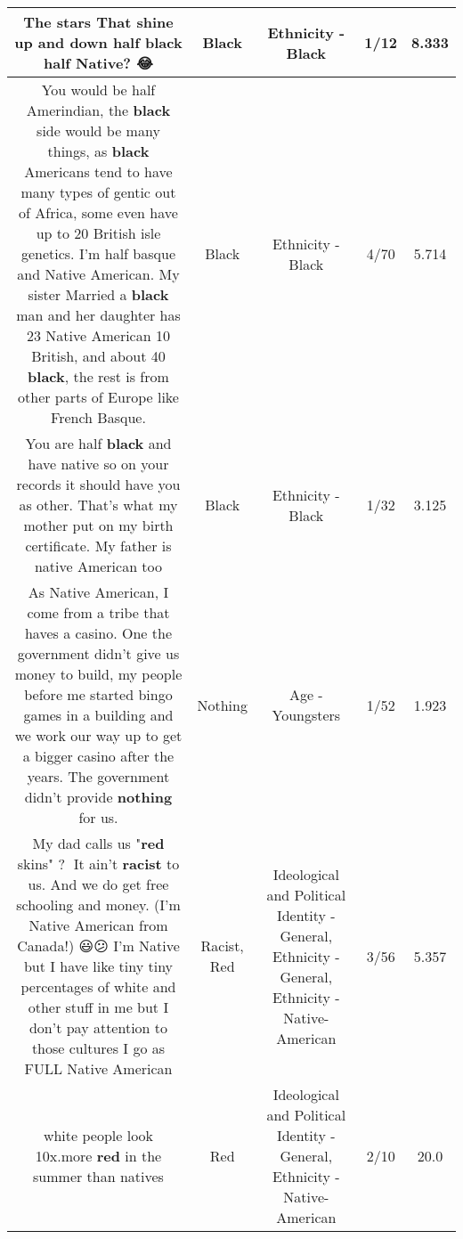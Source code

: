 \documentclass[11pt]{article}
\newlength\mylength
\begin{document}
\begin{center}
\begin{longtable}{|C{.65\mylength}|C{.30\mylength}|C{.12\mylength}|C{.12\mylength}|C{.12\mylength}|}
  \small The stars That shine up and down half \textbf{black} half Native? 😂\normalsize   & Black & Ethnicity - Black & 1/12 & 8.333 \\  \hline
  \small You would be half Amerindian, the \textbf{black} side would be many things, as \textbf{black} Americans tend to have many types of gentic out of Africa, some even have up to 20 British isle genetics. I'm half basque and Native American. My sister Married a \textbf{black} man and her daughter has 23 Native American 10 British, and about 40 \textbf{black}, the rest is from other parts of Europe like French Basque.\normalsize   & Black & Ethnicity - Black & 4/70 & 5.714 \\  \hline
  \small You are half \textbf{black} and  have native so on your records it should have you as other. That's what my mother put on my birth certificate. My father is native American too\normalsize   & Black & Ethnicity - Black & 1/32 & 3.125 \\  \hline
  \small As Native American, I come from a tribe that haves a casino. One the government didn't give us money to build, my people before me started bingo games in a building and we work our way up to get a bigger casino after the years. The government didn't provide \textbf{nothing} for us.\normalsize   & Nothing & Age - Youngsters & 1/52 & 1.923 \\  \hline
  \small My dad calls us "\textbf{r\textbf{ed}} skins" ? 🤔It ain't \textbf{racist} to us. And we do get free schooling and money. (I'm Native American from Canada!) 😃😕 I'm Native but I have like tiny tiny percentages of white and other stuff in me but I don't pay attention to those cultures I go as FULL Native American\normalsize   & Racist, Red &  Ideological and Political Identity - General, Ethnicity - General, Ethnicity - Native-American & 3/56 & 5.357 \\  \hline
  \small white people look 10x.more \textbf{r\textbf{ed}} in the summer than natives\normalsize   & Red &  Ideological and Political Identity - General, Ethnicity - Native-American & 2/10 & 20.0 \\  \hline

\end{longtable}
\end{center}
\end{document}
